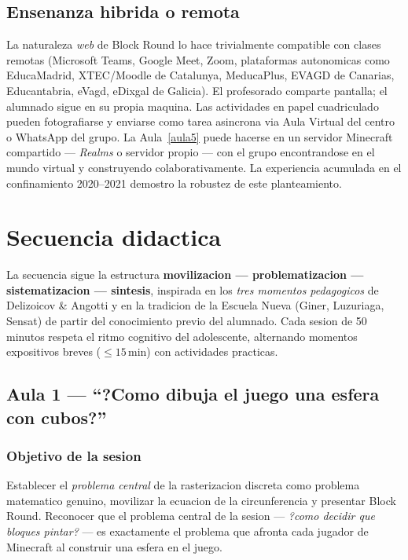 \documentclass[12pt,a4paper]{scrartcl}
\newcommand{\acc}[1]{\textcolor{accent}{\textbf{#1}}}
\begin{document}
\subsection{Ensenanza hibrida o remota}
La naturaleza \emph{web} de Block Round lo hace trivialmente compatible con clases remotas (Microsoft Teams, Google Meet, Zoom, plataformas autonomicas como EducaMadrid, XTEC/Moodle de Catalunya, MeducaPlus, EVAGD de Canarias, Educantabria, eVagd, eDixgal de Galicia). El profesorado comparte pantalla; el alumnado sigue en su propia maquina. Las actividades en papel cuadriculado pueden fotografiarse y enviarse como tarea asincrona via Aula Virtual del centro o WhatsApp del grupo. La Aula~\ref{aula5} puede hacerse en un servidor Minecraft compartido --- \emph{Realms} o servidor propio --- con el grupo encontrandose en el mundo virtual y construyendo colaborativamente. La experiencia acumulada en el confinamiento 2020--2021 demostro la robustez de este planteamiento.

\section{Secuencia didactica}\label{sec:sequencia}

La secuencia sigue la estructura \acc{movilizacion --- problematizacion --- sistematizacion --- sintesis}, inspirada en los \emph{tres momentos pedagogicos} de Delizoicov \& Angotti y en la tradicion de la Escuela Nueva (Giner, Luzuriaga, Sensat) de partir del conocimiento previo del alumnado. Cada sesion de 50 minutos respeta el ritmo cognitivo del adolescente, alternando momentos expositivos breves ($\leq 15$\,min) con actividades practicas.

\subsection{Aula 1 --- \enquote{?Como dibuja el juego una esfera con cubos?}}\label{aula1}

\subsubsection*{Objetivo de la sesion}
Establecer el \emph{problema central} de la rasterizacion discreta como problema matematico genuino, movilizar la ecuacion de la circunferencia y presentar Block Round. Reconocer que el problema central de la sesion --- \emph{?como decidir que bloques pintar?} --- es exactamente el problema que afronta cada jugador de Minecraft al construir una esfera en el juego.
\end{document}
